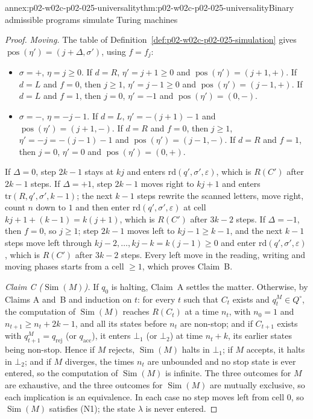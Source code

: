 \begin{annexitem}{annex:p02-w02c-p02-025-universality}{thm:p02-w02c-p02-025-universality}{Binary admissible programs simulate Turing machines}
\begin{proof}
\emph{Moving.}  The table of
Definition~\ref{def:p02-w02c-p02-025-simulation} gives
\(\operatorname{pos}(\eta')=(j+\Delta,\sigma')\), using \(f=f_j\):
\begin{itemize}
\item \(\sigma=+\), \(\eta=j\geq0\).  If \(d=R\), \(\eta'=j+1\geq0\) and
  \(\operatorname{pos}(\eta')=(j+1,+)\).  If \(d=L\) and \(f=0\), then
  \(j\geq1\), \(\eta'=j-1\geq0\) and \(\operatorname{pos}(\eta')=(j-1,+)\).  If
  \(d=L\) and \(f=1\), then \(j=0\), \(\eta'=-1\) and
  \(\operatorname{pos}(\eta')=(0,-)\).
\item \(\sigma=-\), \(\eta=-j-1\).  If \(d=L\), \(\eta'=-(j+1)-1\) and
  \(\operatorname{pos}(\eta')=(j+1,-)\).  If \(d=R\) and \(f=0\), then
  \(j\geq1\), \(\eta'=-j=-(j-1)-1\) and \(\operatorname{pos}(\eta')=(j-1,-)\).  If
  \(d=R\) and \(f=1\), then \(j=0\), \(\eta'=0\) and
  \(\operatorname{pos}(\eta')=(0,+)\).
\end{itemize}
If \(\Delta=0\), step \(2k-1\) stays at \(kj\) and enters
\(\mathrm{rd}(q',\sigma',\varepsilon)\), which is \(R(C')\) after \(2k-1\) steps.  If
\(\Delta=+1\), step \(2k-1\) moves right to \(kj+1\) and enters
\(\mathrm{tr}(R,q',\sigma',k-1)\); the next \(k-1\) steps rewrite the scanned
letters, move right, count \(n\) down to \(1\) and then enter
\(\mathrm{rd}(q',\sigma',\varepsilon)\) at cell \(kj+1+(k-1)=k(j+1)\), which is
\(R(C')\) after \(3k-2\) steps.  If \(\Delta=-1\), then \(f=0\), so \(j\geq1\);
step \(2k-1\) moves left to \(kj-1\geq k-1\), and the next \(k-1\) steps move
left through \(kj-2,\ldots,kj-k=k(j-1)\geq0\) and enter
\(\mathrm{rd}(q',\sigma',\varepsilon)\), which is \(R(C')\) after \(3k-2\) steps.
Every left move in the reading, writing and moving phases starts from a cell
\(\geq1\), which proves Claim~B.

\emph{Claim C (\(\operatorname{Sim}(M)\)).}  If \(q_0\) is halting, Claim~A
settles the matter.  Otherwise, by Claims A and~B and induction on \(t\): for
every \(t\) such that \(C_t\) exists and \(q^M_t\in Q^{\circ}\), the computation of
\(\operatorname{Sim}(M)\) reaches \(R(C_t)\) at a time \(n_t\), with \(n_0=1\)
and \(n_{t+1}\geq n_t+2k-1\), and all its states before \(n_t\) are non-stop;
and if \(C_{t+1}\) exists with \(q^M_{t+1}=q_{\mathrm{rej}}\) (or
\(q_{\mathrm{acc}}\)), it enters \(\bot_1\) (or \(\bot_2\)) at time
\(n_t+k\), its earlier states being non-stop.  Hence if \(M\) rejects,
\(\operatorname{Sim}(M)\) halts in \(\bot_1\); if \(M\) accepts, it halts in
\(\bot_2\); and if \(M\) diverges, the times \(n_t\) are unbounded and no stop
state is ever entered, so the computation of \(\operatorname{Sim}(M)\) is
infinite.  The three outcomes for \(M\) are exhaustive, and the three outcomes
for \(\operatorname{Sim}(M)\) are mutually exclusive, so each implication is an
equivalence.  In each case no step moves left from cell \(0\), so
\(\operatorname{Sim}(M)\) satisfies (N1); the state \(\lambda\) is never
entered.


\end{proof}
\end{annexitem}
